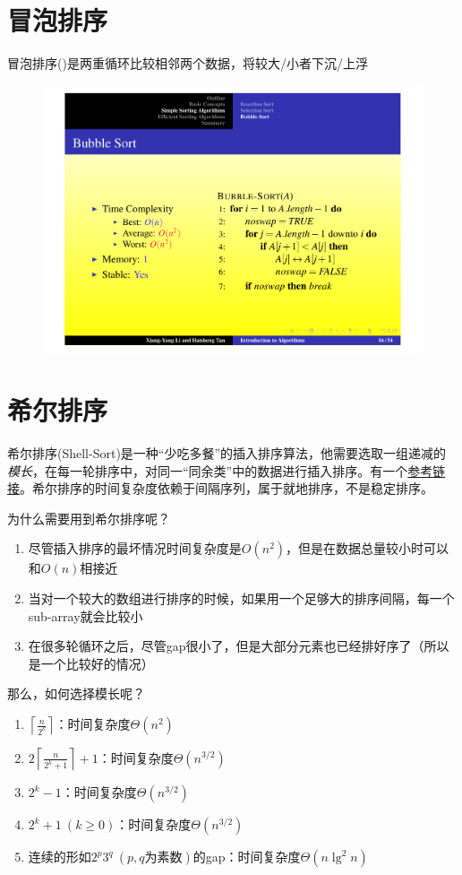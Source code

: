 \documentclass[]{report}
\begin{document}
	\section{冒泡排序}
		冒泡排序({})是两重循环比较相邻两个数据，将较大/小者下沉/上浮
		\begin{figure}[h!]
			\centering
			\begin{minipage}{40em}
				\centering
				\includegraphics[scale = 0.45]{images/Bubble_Sort.pdf}
			\end{minipage}
		\end{figure}
	\section{希尔排序}
		希尔排序(Shell-Sort)是一种“少吃多餐”的插入排序算法，他需要选取一组递减的\textit{模长}，在每一轮排序中，对同一“同余类”中的数据进行插入排序。有一个\href{https://blog.csdn.net/qq_39207948/article/details/80006224}{参考链接}。希尔排序的时间复杂度依赖于间隔序列，属于就地排序，不是稳定排序。\par
		为什么需要用到希尔排序呢？
		\begin{enumerate}
			\item 尽管插入排序的最坏情况时间复杂度是$O(n^2)$，但是在数据总量较小时可以和$O(n)$相接近
			\item 当对一个较大的数组进行排序的时候，如果用一个足够大的排序间隔，每一个sub-array就会比较小
			\item 在很多轮循环之后，尽管gap很小了，但是大部分元素也已经排好序了（所以是一个比较好的情况）
		\end{enumerate}
		那么，如何选择模长呢？
		\begin{enumerate}
			\item $\left\lceil\frac{n}{2^k}\right\rceil$：时间复杂度$\Theta(n^2)$
			\item $2\left\lceil\frac{n}{2^k+1}\right\rceil+1$：时间复杂度$\Theta(n^{3/2})$
			\item $2^k-1$：时间复杂度$\Theta(n^{3/2})$
			\item $2^k+1\ (k\ge0)$：时间复杂度$\Theta(n^{3/2})$
			\item 连续的形如$2^p3^q\ (p,q\mbox{为素数})$的gap：时间复杂度$\Theta(n\lg^2n)$
		\end{enumerate}
\end{document}
